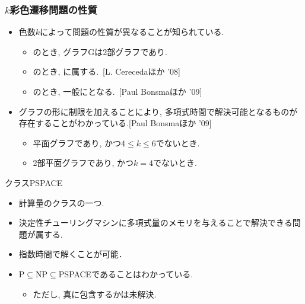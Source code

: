 \begin{frame}\frametitle{$k$彩色遷移問題の性質}

  \begin{itemize}
    \item 色数$k$によって問題の性質が異なることが知られている.
    \begin{itemize}
      \item {}のとき, グラフGは2部グラフであり.
      \item {}のとき, に属する.~[L. Cerecedaほか '08]
      \item {}のとき, 一般にとなる.~[Paul Bonsmaほか '09]
    \end{itemize}

    \item グラフの形に制限を加えることにより, 多項式時間で解決可能となるものが存在することがわかっている.[Paul Bonsmaほか '09]
    \begin{itemize}
      \item 平面グラフであり, かつ$4 \le k \le 6$でないとき.
      \item 2部平面グラフであり, かつ$k=4$でないとき.
    \end{itemize}

  \end{itemize}

\end{frame}


\begin{frame}{クラスPSPACE}
  \begin{itemize}
    \item 計算量のクラスの一つ.
    \item 決定性チューリングマシンに多項式量のメモリを与えることで解決できる問題が属する.
    \item 指数時間で解くことが可能．
    \item P$\subseteq$NP$\subseteq$PSPACEであることはわかっている.
    \begin{itemize}
      \item ただし, 真に包含するかは未解決.
    \end{itemize}
  \end{itemize}
\end{frame}


